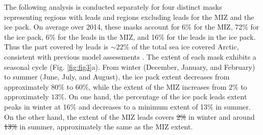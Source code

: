 \documentclass[lineno,sn-basic]{sn-jnl}%
\providecommand{\DIFadd}[1]{{\protect\color{blue}\uwave{#1}}} %
\providecommand{\DIFdel}[1]{{\protect\color{red}\sout{#1}}}                      %
\providecommand{\DIFaddbegin}{} %
\providecommand{\DIFaddend}{} %
\providecommand{\DIFdelbegin}{} %
\providecommand{\DIFdelend}{} %
\newcommand{\DIFscaledelfig}{0.5}
\newlength{\DIFdelgraphicswidth} %
\newlength{\DIFdelgraphicsheight} %
\newcommand{\DIFaddincludegraphics}[2][]{{\color{blue}\fbox{\DIFOincludegraphics[#1]{#2}}}} %
\newcommand{\DIFdelincludegraphics}[2][]{%
\sbox{\DIFdelgraphicsbox}{\DIFOincludegraphics[#1]{#2}}%
\settoboxwidth{\DIFdelgraphicswidth}{\DIFdelgraphicsbox} %
\settoboxtotalheight{\DIFdelgraphicsheight}{\DIFdelgraphicsbox} %
\scalebox{\DIFscaledelfig}{%
\parbox[b]{\DIFdelgraphicswidth}{\usebox{\DIFdelgraphicsbox}\\[-\baselineskip] \rule{\DIFdelgraphicswidth}{0em}}\llap{\resizebox{\DIFdelgraphicswidth}{\DIFdelgraphicsheight}{%
\setlength{\unitlength}{\DIFdelgraphicswidth}%
\begin{picture}(1,1)%
\thicklines\linethickness{2pt} %
{\color[rgb]{1,0,0}\put(0,0){\framebox(1,1){}}}%
{\color[rgb]{1,0,0}\put(0,0){\line( 1,1){1}}}%
{\color[rgb]{1,0,0}\put(0,1){\line(1,-1){1}}}%
\end{picture}%
}\hspace*{3pt}}} %
} %
\DeclareRobustCommand{\DIFaddbegin}{\DIFOaddbegin \let\includegraphics\DIFaddincludegraphics} %
\DeclareRobustCommand{\DIFaddend}{\DIFOaddend \let\includegraphics\DIFOincludegraphics} %
\DeclareRobustCommand{\DIFdelbegin}{\DIFOdelbegin \let\includegraphics\DIFdelincludegraphics} %
\DeclareRobustCommand{\DIFdelend}{\DIFOaddend \let\includegraphics\DIFOincludegraphics} %
\begin{document}
The following analysis is conducted separately for four distinct masks representing regions with leads and regions excluding leads for the MIZ and the ice pack. On average over 2014, these masks account for 6\% for the MIZ, 72\% for the ice pack, 6\% for the leads in the MIZ, and 16\% for the leads in the ice pack. Thus the part covered by leads is $\sim 22\%$ of the total sea ice covered Arctic, consistent with previous model assessments \citep{Wang_leads_2016}. 
The extent of each mask exhibits a seasonal cycle (Fig. \ref{fig:fig3}a). From winter (December, January, and February) to  summer (June, July, and August), the ice pack extent decreases from approximately $80\%$ to $60\%$, while the extent of the MIZ increases from $2\%$ to approximately $13\%$. 
On one hand, the percentage of the ice pack leads extent peaks in winter at 16\% and decreases to a minimum extent of 13\% in summer. On the other hand, the extent of the MIZ leads covers \DIFdelbegin \DIFdel{2\% }\DIFdelend \DIFaddbegin \DIFadd{$2\%$ }\DIFaddend in winter and around \DIFdelbegin \DIFdel{13\% }\DIFdelend \DIFaddbegin \DIFadd{$13\%$ }\DIFaddend in summer, approximately the same as the MIZ extent. 
\end{document}
